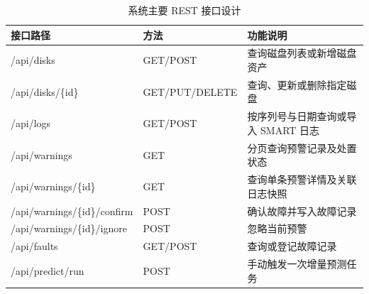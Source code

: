{    \begin{table}[htbp]
        \centering
        \caption{\label{tab:sw-api}系统主要 REST 接口设计}
        \begin{tabularx}{\linewidth}{>{\ttfamily\raggedright\arraybackslash}m{5.2cm} >{\centering\arraybackslash}m{1.4cm} >{\raggedright\arraybackslash}X}
            \toprule
            接口路径 & 方法 & 功能说明 \\
            \midrule
            /api/disks & GET/\allowbreak POST & 查询磁盘列表或新增磁盘资产 \\
            /api/disks/\{id\} & GET/\allowbreak PUT/\allowbreak DELETE & 查询、更新或删除指定磁盘 \\
            /api/logs & GET/\allowbreak POST & 按序列号与日期查询或导入 SMART 日志 \\
            /api/warnings & GET & 分页查询预警记录及处置状态 \\
            /api/warnings/\{id\} & GET & 查询单条预警详情及关联日志快照 \\
            /api/warnings/\{id\}/confirm & POST & 确认故障并写入故障记录 \\
            /api/warnings/\{id\}/ignore & POST & 忽略当前预警 \\
            /api/faults & GET/\allowbreak POST & 查询或登记故障记录 \\
            /api/predict/run & POST & 手动触发一次增量预测任务 \\
            \bottomrule
        \end{tabularx}
    \end{table}

}

